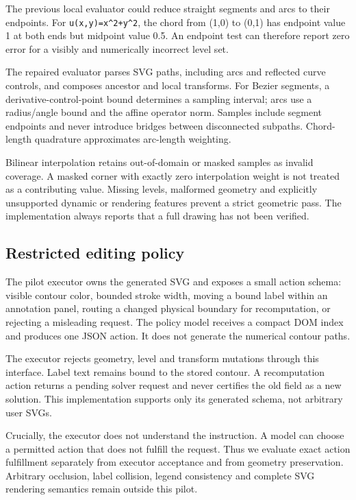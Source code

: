 \documentclass[
  11pt,
  a4paper,
]{article}
\begin{document}
The previous local evaluator could reduce straight segments and arcs to
their endpoints. For \texttt{u(x,y)=x\^{}2+y\^{}2}, the chord from (1,0)
to (0,1) has endpoint value 1 at both ends but midpoint value 0.5. An
endpoint test can therefore report zero error for a visibly and
numerically incorrect level set.

The repaired evaluator parses SVG paths, including arcs and reflected
curve controls, and composes ancestor and local transforms. For Bezier
segments, a derivative-control-point bound determines a sampling
interval; arcs use a radius/angle bound and the affine operator norm.
Samples include segment endpoints and never introduce bridges between
disconnected subpaths. Chord-length quadrature approximates arc-length
weighting.

Bilinear interpolation retains out-of-domain or masked samples as
invalid coverage. A masked corner with exactly zero interpolation weight
is not treated as a contributing value. Missing levels, malformed
geometry and explicitly unsupported dynamic or rendering features
prevent a strict geometric pass. The implementation always reports that
a full drawing has not been verified.

\subsection{Restricted editing policy}\label{restricted-editing-policy}

The pilot executor owns the generated SVG and exposes a small action
schema: visible contour color, bounded stroke width, moving a bound
label within an annotation panel, routing a changed physical boundary
for recomputation, or rejecting a misleading request. The policy model
receives a compact DOM index and produces one JSON action. It does not
generate the numerical contour paths.

The executor rejects geometry, level and transform mutations through
this interface. Label text remains bound to the stored contour. A
recomputation action returns a pending solver request and never
certifies the old field as a new solution. This implementation supports
only its generated schema, not arbitrary user SVGs.

Crucially, the executor does not understand the instruction. A model can
choose a permitted action that does not fulfill the request. Thus we
evaluate exact action fulfillment separately from executor acceptance
and from geometry preservation. Arbitrary occlusion, label collision,
legend consistency and complete SVG rendering semantics remain outside
this pilot.
\end{document}
